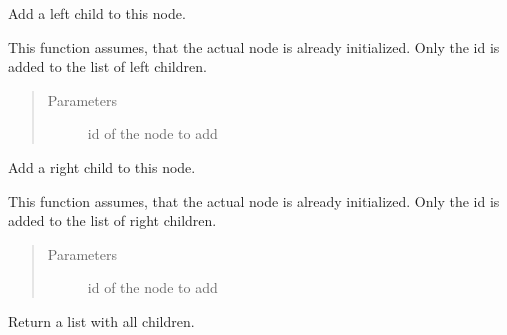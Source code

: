 \documentclass[letterpaper,10pt,english]{sphinxmanual}
\begin{document}
\begin{fulllineitems}
\begin{fulllineitems}
\begin{quote}
\begin{description}
\end{description}\end{quote}

\end{fulllineitems}


\begin{fulllineitems}
\label{\detokenize{api:conll_parser.Node.add_lchild}}
Add a left child to this node.

This function assumes, that the actual node is already
initialized. Only the id is added to the list of left
children.
\begin{quote}\begin{description}
\item[{Parameters}] \leavevmode
{} \textendash{} id of the node to add

\end{description}\end{quote}

\end{fulllineitems}


\begin{fulllineitems}
\label{\detokenize{api:conll_parser.Node.add_rchild}}
Add a right child to this node.

This function assumes, that the actual node is already
initialized. Only the id is added to the list of right
children.
\begin{quote}\begin{description}
\item[{Parameters}] \leavevmode
{} \textendash{} id of the node to add

\end{description}\end{quote}

\end{fulllineitems}


\begin{fulllineitems}
\label{\detokenize{api:conll_parser.Node.get_children}}
Return a list with all children.


\end{fulllineitems}
\end{fulllineitems}
\end{document}
